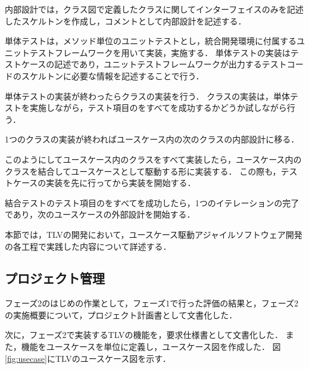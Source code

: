 内部設計では，クラス図で定義したクラスに関してインターフェイスのみを記述したスケルトンを作成し，コメントとして内部設計を記述する．

単体テストは，メソッド単位のユニットテストとし，統合開発環境に付属するユニットテストフレームワークを用いて実装，実施する．
単体テストの実装はテストケースの記述であり，ユニットテストフレームワークが出力するテストコードのスケルトンに必要な情報を記述することで行う．

単体テストの実装が終わったらクラスの実装を行う．
クラスの実装は，単体テストを実施しながら，テスト項目のをすべてを成功するかどうか試しながら行う．

1つのクラスの実装が終わればユースケース内の次のクラスの内部設計に移る．

このようにしてユースケース内のクラスをすべて実装したら，ユースケース内のクラスを結合してユースケースとして駆動する形に実装する．
この際も，テストケースの実装を先に行ってから実装を開始する．

結合テストのテスト項目のをすべてを成功したら，1つのイテレーションの完了であり，次のユースケースの外部設計を開始する．

本節では，TLVの開発において，ユースケース駆動アジャイルソフトウェア開発の各工程で実践した内容について詳述する．

\subsection{プロジェクト管理}

フェーズ2のはじめの作業として，フェーズ1で行った評価の結果と，フェーズ2の実施概要について，プロジェクト計画書として文書化した．

次に，フェーズ2で実装するTLVの機能を，要求仕様書として文書化した．
また，機能をユースケースを単位に定義し，ユースケース図を作成した．
図\ref{fig:usecase}にTLVのユースケース図を示す．

